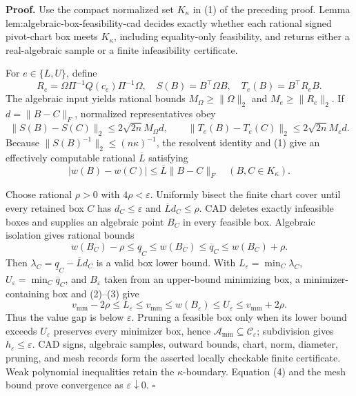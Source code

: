\textbf{Proof.}
Use the compact normalized set \(K_\kappa\) in (1) of the preceding proof.  Lemma lem:algebraic-box-feasibility-cad decides exactly whether each rational signed pivot-chart box meets \(K_\kappa\), including equality-only feasibility, and returns either a real-algebraic sample or a finite infeasibility certificate.

For \(e\in\{L,U\}\), define
\[
R_e=\Omega\Pi^{-1}Q(c_e)\Pi^{-1}\Omega,
\quad S(B)=B^{\top}\Omega B,
\quad T_e(B)=B^{\top}R_eB.
\]
The algebraic input yields rational bounds \(M_\Omega\ge\lVert\Omega\rVert_2\) and \(M_e\ge\lVert R_e\rVert_2\).  If \(d=\lVert B-C\rVert_F\), normalized representatives obey
\[
\lVert S(B)-S(C)\rVert_2\le2\sqrt{2n}M_\Omega d,
\qquad
\lVert T_e(B)-T_e(C)\rVert_2\le2\sqrt{2n}M_ed.
\tag{1}
\]
Because \(\lVert S(B)^{-1}\rVert_2\le(n\kappa)^{-1}\), the resolvent identity and (1) give an effectively computable rational \(\overline L\) satisfying
\[
|w(B)-w(C)|\le\overline L\lVert B-C\rVert_F
\quad(B,C\in K_\kappa).
\tag{2}
\]

Choose rational \(\rho>0\) with \(4\rho<\varepsilon\).  Uniformly bisect the finite chart cover until every retained box \(C\) has \(d_C\le\varepsilon\) and \(\overline Ld_C\le\rho\).  CAD deletes exactly infeasible boxes and supplies an algebraic point \(B_C\) in every feasible box.  Algebraic isolation gives rational bounds
\[
w(B_C)-\rho\le\underline q_C\le w(B_C)
\le\overline q_C\le w(B_C)+\rho.
\tag{3}
\]
Then \(\lambda_C=\underline q_C-\overline Ld_C\) is a valid box lower bound.  With \(L_\varepsilon=\min_C\lambda_C\), \(U_\varepsilon=\min_C\overline q_C\), and \(B_\varepsilon\) taken from an upper-bound minimizing box, a minimizer-containing box and (2)--(3) give
\[
v_{\mathrm{mm}}-2\rho\le L_\varepsilon\le v_{\mathrm{mm}}
\le w(B_\varepsilon)\le U_\varepsilon\le v_{\mathrm{mm}}+2\rho.
\tag{4}
\]
Thus the value gap is below \(\varepsilon\).  Pruning a feasible box only when its lower bound exceeds \(U_\varepsilon\) preserves every minimizer box, hence \(\mathcal A_{\mathrm{mm}}\subseteq\mathcal C_\varepsilon\); subdivision gives \(h_\varepsilon\le\varepsilon\).  CAD signs, algebraic samples, outward bounds, chart, norm, diameter, pruning, and mesh records form the asserted locally checkable finite certificate.  Weak polynomial inequalities retain the \(\kappa\)-boundary.  Equation (4) and the mesh bound prove convergence as \(\varepsilon\downarrow0\). \(\square\)